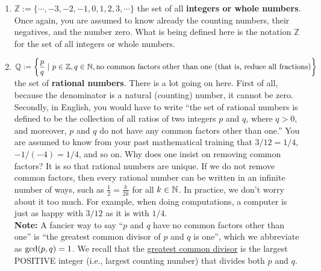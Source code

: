 \begin{tcolorbox}[colback = mylightblue, title=\textbf{Given the above as motivation, we define a set of symbols that we will frequently use in the course:}, breakable]
\begin{definition}
\begin{enumerate}
        \item  $\mathbb{Z}:=  \{\dotsb, -3, -2, -1, 0, 1, 2, 3, \dotsb\}$ the set of all \textbf{integers or whole numbers}. Once again, you are assumed to know already the counting numbers, their negatives, and the number zero.  What is being defined here is the notation $\mathbb{Z}$ for the set of all integers or whole numbers.
        
        \item  $\mathbb Q := \left\{\dfrac{p}{q}~ |~ p\in \mathbb Z, q \in \mathbb N, \textnormal{no common factors other than one (that is, reduce all fractions)}\right\}$ the set of \textbf{rational numbers}.  There is a lot going on here. First of all, because the denominator is a natural (counting) number, it cannot be zero. Secondly, in English, you would have to write ``the set of rational numbers is defined to be the collection of all ratios of two integers $p$ and $q$, where $q >0$, and moreover, $p$ and $q$ do not have any common factors other than one.'' You are assumed to know from your past mathematical training that $3/12 = 1/4$, $-1/(-4) = 1/4$, and so on. Why does one insist on removing common factors? It is so that rational numbers are unique. If we do not remove common factors, then every rational number can be written in an infinite number of ways, such as $\frac{1}{2} = \frac{k}{2 k}$ for all $k \in \mathbb N$. In practice, we don't worry about it too much. For example, when doing computations, a computer is just as happy with $3/12$ as it is with $1/4$. \\

        \textbf{Note:} A fancier way to say ``$p$ and $q$ have no common factors other than one'' is ``the greatest common divisor of $p$ and $q$ is one'', which we abbreviate as ${\rm gcd}(p,q)=1$. We recall that the \href{https://en.wikipedia.org/wiki/Greatest_common_divisor}{greatest common divisor} is the largest POSITIVE integer (i.e., largest counting number) that divides both $p$ and $q$.
         

\end{enumerate}
\end{definition}
\end{tcolorbox}
